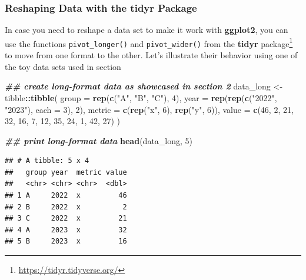 \documentclass[
]{krantz}
\makeatletter
\newenvironment{Shaded}{\begin{snugshade}}{\end{snugshade}}
\newcommand{\AttributeTok}[1]{\textcolor[rgb]{0.27,0.27,0.27}{#1}}
\newcommand{\DecValTok}[1]{\textcolor[rgb]{0.06,0.06,0.06}{#1}}
\newcommand{\DocumentationTok}[1]{\textcolor[rgb]{0.37,0.37,0.37}{\textbf{\textit{#1}}}}
\newcommand{\FunctionTok}[1]{\textcolor[rgb]{0.27,0.27,0.27}{\textbf{#1}}}
\newcommand{\NormalTok}[1]{#1}
\newcommand{\OtherTok}[1]{\textcolor[rgb]{0.37,0.37,0.37}{#1}}
\newcommand{\SpecialCharTok}[1]{\textcolor[rgb]{0.43,0.43,0.43}{\textbf{#1}}}
\newcommand{\StringTok}[1]{\textcolor[rgb]{0.5,0.5,0.5}{#1}}
\renewcommand{\href}[2]{#2\footnote{\url{#1}}}
\newenvironment{kframe}{%
\medskip{}
\setlength{\fboxsep}{.8em}
 \def\at@end@of@kframe{}%
 \ifinner\ifhmode%
  \def\at@end@of@kframe{\end{minipage}}%
  \begin{minipage}{\columnwidth}%
 \fi\fi%
 \def\FrameCommand##1{\hskip\@totalleftmargin \hskip-\fboxsep
 \colorbox{shadecolor}{##1}\hskip-\fboxsep
     \hskip-\linewidth \hskip-\@totalleftmargin \hskip\columnwidth}%
 \MakeFramed {\advance\hsize-\width
   \@totalleftmargin\z@ \linewidth\hsize
   \@setminipage}}%
 {\par\unskip\endMakeFramed%
 \at@end@of@kframe}
\renewenvironment{Shaded}{\begin{kframe}}{\end{kframe}}
\makeatother
\begin{document}
\hypertarget{tidyr}{%
\subsubsection{\texorpdfstring{Reshaping Data with the \textbf{tidyr} Package}{Reshaping Data with the tidyr Package}}\label{tidyr}}

In case you need to reshape a data set to make it work with \textbf{ggplot2}, you can use the functions \texttt{pivot\_longer()} and \texttt{pivot\_wider()} from the \href{https://tidyr.tidyverse.org/}{\textbf{tidyr} package} \citep{tidyr} to move from one format to the other. Let's illustrate their behavior using one of the toy data sets used in section

\begin{Shaded}
\begin{Highlighting}[]
\DocumentationTok{\#\# create long{-}format data as showcased in section 2}
\NormalTok{data\_long }\OtherTok{\textless{}{-}}\NormalTok{ tibble}\SpecialCharTok{::}\FunctionTok{tibble}\NormalTok{(}
  \AttributeTok{group =} \FunctionTok{rep}\NormalTok{(}\FunctionTok{c}\NormalTok{(}\StringTok{"A"}\NormalTok{, }\StringTok{"B"}\NormalTok{, }\StringTok{"C"}\NormalTok{), }\DecValTok{4}\NormalTok{),}
  \AttributeTok{year =} \FunctionTok{rep}\NormalTok{(}\FunctionTok{rep}\NormalTok{(}\FunctionTok{c}\NormalTok{(}\StringTok{"2022"}\NormalTok{, }\StringTok{"2023"}\NormalTok{), }\AttributeTok{each =} \DecValTok{3}\NormalTok{), }\DecValTok{2}\NormalTok{),}
  \AttributeTok{metric =} \FunctionTok{c}\NormalTok{(}\FunctionTok{rep}\NormalTok{(}\StringTok{"x"}\NormalTok{, }\DecValTok{6}\NormalTok{), }\FunctionTok{rep}\NormalTok{(}\StringTok{"y"}\NormalTok{, }\DecValTok{6}\NormalTok{)),}
  \AttributeTok{value =} \FunctionTok{c}\NormalTok{(}\DecValTok{46}\NormalTok{, }\DecValTok{2}\NormalTok{, }\DecValTok{21}\NormalTok{, }\DecValTok{32}\NormalTok{, }\DecValTok{16}\NormalTok{, }\DecValTok{7}\NormalTok{, }\DecValTok{12}\NormalTok{, }\DecValTok{35}\NormalTok{, }\DecValTok{24}\NormalTok{, }\DecValTok{1}\NormalTok{, }\DecValTok{42}\NormalTok{, }\DecValTok{27}\NormalTok{)}
\NormalTok{)}

\DocumentationTok{\#\# print long{-}format data}
\FunctionTok{head}\NormalTok{(data\_long, }\DecValTok{5}\NormalTok{)}
\end{Highlighting}
\end{Shaded}

\begin{verbatim}
## # A tibble: 5 x 4
##   group year  metric value
##   <chr> <chr> <chr>  <dbl>
## 1 A     2022  x         46
## 2 B     2022  x          2
## 3 C     2022  x         21
## 4 A     2023  x         32
## 5 B     2023  x         16
\end{verbatim}
\end{document}
